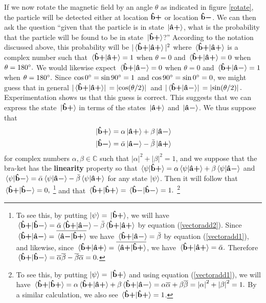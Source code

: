 \documentclass[letter, 12pt]{turabian-thesis}
\theoremstyle{hypothesis}
\newcommand{\uvb}[1]{\vb{\hat{{#1}}}}
\newcommand{\uvbp}[1]{\uvb{#1}\bm{+}}
\newcommand{\uvbm}[1]{\uvb{#1}\bm{-}}
\let\origfootnote\footnote %
\renewcommand{\footnote}[1]{%
\noindent %
\origfootnote{#1}}
\begin{document}
 If we now rotate the magnetic field by an angle $\theta$ as indicated in figure \ref{rotate}, the particle will be detected either at location $\uvbp{b}$ or location $\uvbm{b}$. We can then ask the question “given that the particle is in state $\ket*{\uvbp{a}}$, what is the probability that the particle will be found to be in state $\ket*{\uvbp{b}}$?” According to the notation discussed above, this probability will be $|\ip*{\uvbp{b}}{\uvbp{a}}|^2$ where $\ip*{\uvbp{b}}{\uvbp{a}}$ is a complex number such that $\ip*{\uvbp{b}}{\uvbp{a}}=1$ when $\theta =0$ and $\ip*{\uvbp{b}}{\uvbp{a}}=0$ when $\theta=180\degree.$ We would likewise expect $\ip*{\uvbp{b}}{\uvbm{a}}=0$ when $\theta =0$ and $\ip*{\uvbp{b}}{\uvbm{a}}=1$ when $\theta=180\degree.$ Since $\cos 0\degree = \sin 90\degree = 1$ and $\cos 90\degree = \sin 0\degree = 0$, we might guess that in general $\abs*{\ip*{\uvbp{b}}{\uvbp{a}}}=\abs*{\cos(\theta/2)}$ and  $\abs*{\ip*{\uvbp{b}}{\uvbm{a}}}=\abs*{\sin(\theta/2)}.$ Experimentation shows us that this guess is correct.
 This suggests that we can express the state $\ket*{\uvbp{b}}$ in terms of the states $\ket*{\uvbp{a}}$ and $\ket*{\uvbm{a}}$. We thus suppose that 
\begin{subequations}\label{vectoradd}
\begin{align}
\ket*{\uvbp{b}}&=\alpha\ket*{\uvbp{a}}+\beta\ket*{\uvbm{a}}\label{vectoradd1}\\
\ket*{\uvbm{b}}&=\bar{\alpha}\ket*{\uvbm{a}}-\bar{\beta}\ket*{\uvbp{a}}\label{vectoradd2}
\end{align} 
\end{subequations}
for complex numbers $\alpha, \beta \in \mathbb{C}$ such that $|\alpha|^2+|\beta|^2=1$, and we suppose that the bra-ket has the \textbf{linearity} property so that  $\ip*{\psi}{\uvbp{b}}=\alpha\ip*{\psi}{\uvbp{a}}+\beta\ip*{\psi}{\uvbm{a}}$ and $\ip*{\psi}{\uvbm{b}}=\bar{\alpha}\ip*{\psi}{\uvbm{a}}-\bar{\beta}\ip*{\psi}{\uvbp{a}}$ for any state $\ket{\psi}$. Then  it will follow that  $\ip*{\uvbp{b}}{\uvbm{b}}=0,$\footnote{To see this, by putting $\ket{\psi}=\ket*{\uvbp{b}}$, we will have $\ip*{\uvbp{b}}{\uvbm{b}}=\bar{\alpha}\ip*{\uvbp{b}}{\uvbm{a}}-\bar{\beta}\ip*{\uvbp{b}}{\uvbp{a}}$ by equation (\ref{vectoradd2}). Since  $\ip*{\uvbp{b}}{\uvbm{a}}=\overline{\ip*{\uvbm{a}}{\uvbp{b}}}$ we have $\ip*{\uvbp{b}}{\uvbm{a}}=\bar{\beta}$ by equation (\ref{vectoradd1}), and likewise, since $\ip*{\uvbp{b}}{\uvbp{a}}=\overline{\ip*{\uvbp{a}}{\uvbp{b}}}$, we have $\ip*{\uvbp{b}}{\uvbp{a}}=\bar{\alpha}.$  Therefore  $\ip*{\uvbp{b}}{\uvbm{b}}=\overline{\alpha}\overline{\beta}-\overline{\beta}{\overline{\alpha}}=0.$ }  and that $\ip*{\uvbp{b}}{\uvbp{b}}=\ip*{\uvbm{b}}{\uvbm{b}} = 1.$\footnote{To see this, by putting $\ket{\psi}=\ket*{\uvbp{b}}$ and using equation (\ref{vectoradd1}), we will have $\ip*{\uvbp{b}}{\uvbp{b}}=\alpha\ip*{\uvbp{b}}{\uvbp{a}}+\beta\ip*{\uvbp{b}}{\uvbm{a}}=\alpha\overline{\alpha}+\beta\overline{\beta}=\abs{\alpha}^2+\abs{\beta}^2=1.$ By a similar calculation, we also see $\ip*{\uvbp{b}}{\uvbp{b}}=1$.}  
\end{document}
